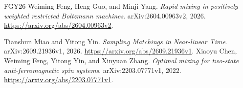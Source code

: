 \documentclass[11pt]{article}
\theoremstyle{remark}\newtheorem{remark}[theorem]{Remark}
\begin{document}
\begin{thebibliography}{FGY26}
Weiming Feng, Heng Guo, and Minji Yang.
\newblock \emph{Rapid mixing in positively weighted restricted Boltzmann machines}.
\newblock arXiv:2604.00963v2, 2026.
\newblock \url{https://arxiv.org/abs/2604.00963v2}.

Tianshun Miao and Yitong Yin.
\newblock \emph{Sampling Matchings in Near-linear Time}.
\newblock arXiv:2609.21936v1, 2026.
\newblock \url{https://arxiv.org/abs/2609.21936v1}.
Xiaoyu Chen, Weiming Feng, Yitong Yin, and Xinyuan Zhang.
\newblock \emph{Optimal mixing for two-state anti-ferromagnetic spin systems}.
\newblock arXiv:2203.07771v1, 2022.
\newblock \url{https://arxiv.org/abs/2203.07771v1}.
\end{thebibliography}
\end{document}
